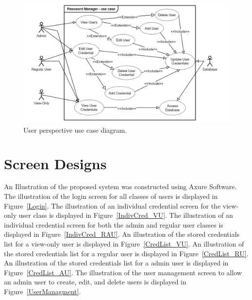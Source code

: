 \documentclass[letterpaper,12pt,oneside,listof=totoc]{scrreprt}
\begin{document}
\begin{figure}
\centering
\includegraphics[width=\linewidth]{UseCaseDiagramUpdate.png}
\caption{User perspective use case diagram.}
\label{Usecase}
\end{figure}

\section{Screen Designs}

An Illustration of the proposed system was constructed using Axure Software. The illustration of the login screen for all classes of users is displayed in Figure~\ref{Login}. The illustration of an individual credential screen for the view-only user class is displayed in Figure~\ref{IndivCred_VU}. The illustration of an individual credential screen for both the admin and regular user classes is displayed in Figure~\ref{IndivCred_RAU}. An illustration of the stored credentials list for a view-only user is displayed in Figure~\ref{CredList_VU}. An illustration of the stored credentials list for a regular user is displayed in Figure~\ref{CredList_RU}. An illustration of the stored credentials list for a admin user is displayed in Figure~\ref{CredList_AU}. The illustration of the user management screen to allow an admin user to create, edit, and delete users is displayed in Figure~\ref{UserManagment}.
\end{document}

